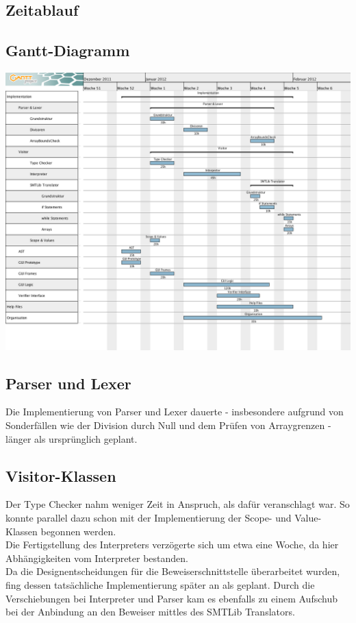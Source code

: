 \begin{landscape}
\section{Zeitablauf}
\subsection{Gantt-Diagramm}
\includegraphics[width=\textwidth]{ImplementierungszeitplanReal.png}
\end{landscape}

\subsection{Parser und Lexer}
Die Implementierung von Parser und Lexer dauerte - insbesondere aufgrund von Sonderf\"{a}llen wie der Division durch Null und dem Pr\"{u}fen von Arraygrenzen - l\"{a}nger als urspr\"{u}nglich geplant.
\subsection{Visitor-Klassen}
Der Type Checker nahm weniger Zeit in Anspruch, als daf\"{u}r veranschlagt war. So konnte parallel dazu schon mit der Implementierung der Scope- und Value-Klassen begonnen werden.\\
Die Fertigstellung des Interpreters verz\"{o}gerte sich um etwa eine Woche, da hier Abh\"{a}ngigkeiten vom Interpreter bestanden.\\
Da die Designentscheidungen f\"{u}r die Beweiserschnittstelle \"{u}berarbeitet wurden, fing dessen tats\"{a}chliche Implementierung sp\"{a}ter an als geplant. Durch die Verschiebungen bei Interpreter und Parser kam es ebenfalls zu einem Aufschub bei der Anbindung an den Beweiser mittles des SMTLib Translators.\\
